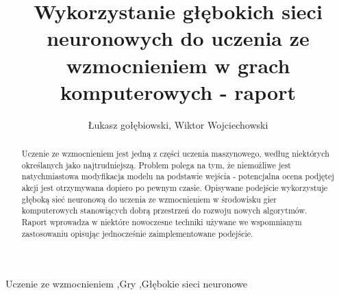 \documentclass[preprint,12pt]{elsarticle}
\begin{document}
\begin{frontmatter}



\title{Wykorzystanie głębokich sieci neuronowych do uczenia ze wzmocnieniem w grach komputerowych - raport}


\author{Łukasz gołębiowski, Wiktor Wojciechowski}

\address{Wrocław, Polska}

\begin{abstract}
Uczenie ze wzmocnieniem jest jedną z części uczenia maszynowego, według niektórych określanych jako najtrudniejszą. Problem polega na tym, że niemożliwe jest natychmiastowa modyfikacja modelu na podstawie wejścia - potencjalna ocena podjętej akcji jest otrzymywana dopiero po pewnym czasie. Opisywane podejście wykorzystuje głęboką sieć neuronową do uczenia ze wzmocnieniem w środowisku gier komputerowych stanowiących dobrą przestrzeń do rozwoju nowych algorytmów. Raport wprowadza w niektóre nowoczesne techniki używane we wspomnianym zastosowaniu opisując jednocześnie zaimplementowane podejście.
\end{abstract}

\begin{keyword}
Uczenie ze wzmocnieniem \sep Gry \sep Głębokie sieci neuronowe


\end{keyword}

\end{frontmatter}
\end{document}
